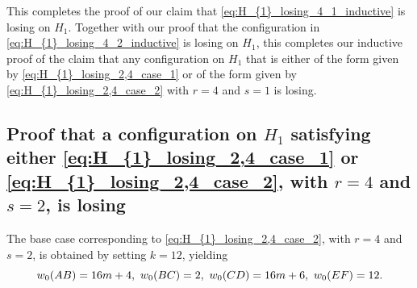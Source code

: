 \documentclass[11pt,reqno]{amsart}
\theoremstyle{definition}
\theoremstyle{definition}
\begin{document}
This completes the proof of our claim that \eqref{eq:H_{1}_losing_4_1_inductive} is losing on $H_{1}$. Together with our proof that the configuration in \eqref{eq:H_{1}_losing_4_2_inductive} is losing on $H_{1}$, this completes our inductive proof of the claim that any configuration on $H_{1}$ that is either of the form given by \eqref{eq:H_{1}_losing_2,4_case_1} or of the form given by \eqref{eq:H_{1}_losing_2,4_case_2} with $r=4$ and $s=1$ is losing.

\subsection{Proof that a configuration on $H_{1}$ satisfying either \eqref{eq:H_{1}_losing_2,4_case_1} or \eqref{eq:H_{1}_losing_2,4_case_2}, with $r=4$ and $s=2$, is losing}\label{subsec:H_{1}_losing_4_3,4_proof}
The base case corresponding to \eqref{eq:H_{1}_losing_2,4_case_2}, with $r=4$ and $s=2$, is obtained by setting $k=12$, yielding \begin{equation}
w_{0}(AB)=16m+4,\ w_{0}(BC)=2,\ w_{0}(CD)=16m+6,\ w_{0}(EF)=12.\label{eq:H_{1}_losing_4_3_base_case}
\end{equation}
\end{document}
